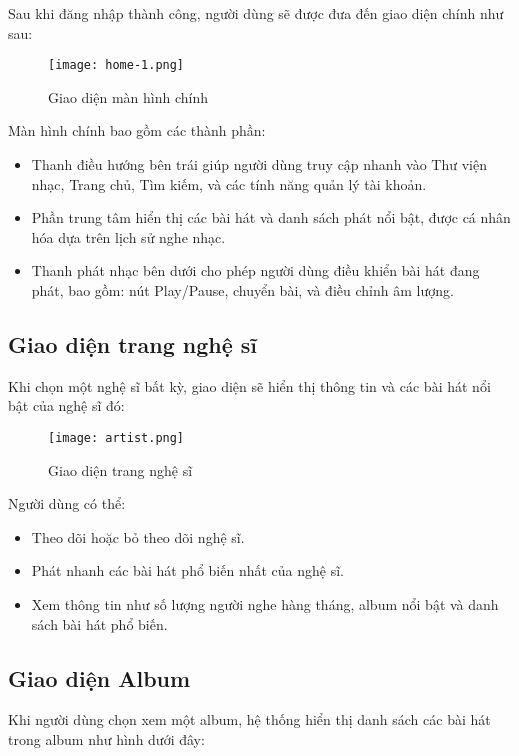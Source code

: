 \documentclass[a4paper]{article}
\begin{document}
Sau khi đăng nhập thành công, người dùng sẽ được đưa đến giao diện chính như sau:

\begin{figure}[!htb]
    \centering
    \texttt{[image: home-1.png]}
    \caption{Giao diện màn hình chính}
    \label{fig:home}
\end{figure}

Màn hình chính bao gồm các thành phần:

\begin{itemize}
    \item Thanh điều hướng bên trái giúp người dùng truy cập nhanh vào Thư viện nhạc, Trang chủ, Tìm kiếm, và các tính năng quản lý tài khoản.
    \item Phần trung tâm hiển thị các bài hát và danh sách phát nổi bật, được cá nhân hóa dựa trên lịch sử nghe nhạc.
    \item Thanh phát nhạc bên dưới cho phép người dùng điều khiển bài hát đang phát, bao gồm: nút Play/Pause, chuyển bài, và điều chỉnh âm lượng.
\end{itemize}

\subsection{Giao diện trang nghệ sĩ}

Khi chọn một nghệ sĩ bất kỳ, giao diện sẽ hiển thị thông tin và các bài hát nổi bật của nghệ sĩ đó:

\begin{figure}[!htb]
    \centering
    \texttt{[image: artist.png]}
    \caption{Giao diện trang nghệ sĩ}
    \label{fig:artist}
\end{figure}

Người dùng có thể:
\begin{itemize}
    \item Theo dõi hoặc bỏ theo dõi nghệ sĩ.
    \item Phát nhanh các bài hát phổ biến nhất của nghệ sĩ.
    \item Xem thông tin như số lượng người nghe hàng tháng, album nổi bật và danh sách bài hát phổ biến.
\end{itemize}

\subsection{Giao diện Album}

Khi người dùng chọn xem một album, hệ thống hiển thị danh sách các bài hát trong album như hình dưới đây:
\end{document}
